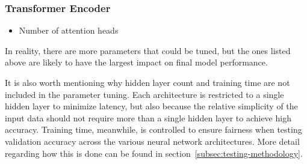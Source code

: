 \subsubsection{Transformer Encoder}
\begin{itemize}
    \item Number of attention heads
\end{itemize}

In reality, there are more parameters that could be tuned, but the ones listed above are likely to have the largest impact on final model performance.

It is also worth mentioning why hidden layer count and training time are not included in the parameter tuning.
Each architecture is restricted to a single hidden layer to minimize latency, but also because the relative simplicity of the input data should not require more than a single hidden layer to achieve high accuracy.
Training time, meanwhile, is controlled to ensure fairness when testing validation accuracy across the various neural network architectures.
More detail regarding how this is done can be found in section~\ref{subsec:testing-methodology}.